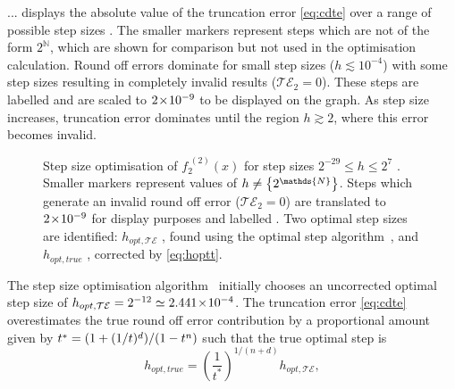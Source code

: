 ...
 displays the absolute value of the truncation error \cref{eq:cdte} over a range of possible step sizes .
The smaller markers  represent steps which are not of the form $2^\mathds{N}$, which are shown for comparison but not used in the optimisation calculation.
Round off errors dominate for small step sizes ($h \lesssim 10^{-4}$) with some step sizes resulting in completely invalid results (\ie $\mathcal{TE}_2 = 0$).
These steps are labelled  and are scaled to $2\!\times\!10^{-9}$ to be displayed on the graph.
As step size increases, truncation error dominates until the region $h \gtrsim 2$, where this error becomes invalid.
\begin{figure}[htp]
\centering
\resizebox{\columnwidth}{!}{}
\caption[Step size optimisation of $f_2^{\;(2)}(x)$]{\label{fig:hopt3pt}Step size optimisation of $f_2^{\;(2)}(x)$ for step sizes $2^{-29} \leq h \leq 2^7$ . Smaller markers  represent values of $\cramped{h \neq \left\{2^\mathds{N}\right\}}$. Steps which generate an invalid round off error (\ie $\mathcal{TE}_2 = 0$) are translated to $2\!\times\!10^{-9}$ for display purposes and labelled . Two optimal step sizes are identified: $h_{opt,\mathcal{TE}}$ , found using the optimal step algorithm~\cite{Mathur2012}, and $h_{opt,true}$ , corrected by \cref{eq:hoptt}.}
\end{figure}

The step size optimisation algorithm~\cite{Mathur2012} initially chooses an uncorrected optimal step size  of $h_{opt,\mathcal{TE}} = 2^{-12} \simeq 2.441\!\times\!10^{-4}$.
The truncation error \cref{eq:cdte} overestimates the true round off error contribution by a proportional amount given by $\cramped{t^* = (1+(1/t)^d)/(1-t^n)}$ such that the true optimal step is
\begin{equation}
h_{opt,true} = \left(\frac{1}{t^*}\right)^{1/(n+d)}h_{opt,\mathcal{TE}},\label{eq:hoptt}
\end{equation}

